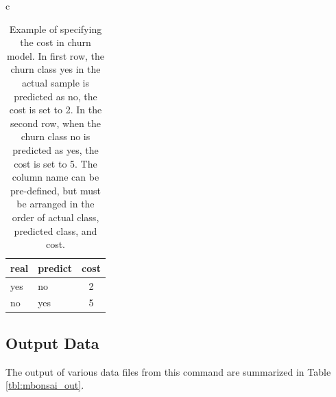 \begin{table}[htbp]
\begin{center}
\begin{tabular}{c}

\begin{minipage}{0.7\hsize}
\begin{center}
\caption{Example of specifying the cost in churn model. In first row, the churn class yes in the actual sample is predicted as no, the cost is set to 2. In the second row, when the churn class no is predicted as yes, the cost is set to 5. The column name can be pre-defined, but must be arranged in the order of actual class, predicted class, and cost. 
\label{tbl:mbonsai_cost}}
{\small
\begin{tabular}{llc}
\hline
real&predict&cost \\
\hline
yes & no  & 2 \\
no  & yes & 5 \\
\hline
\end{tabular} 
}
\end{center}
\end{minipage}

\end{tabular} 
\end{center}
\end{table} 

\newpage 
\subsection{Output Data}
The output of various data files from this command are summarized in Table \ref{tbl:mbonsai_out}. 

